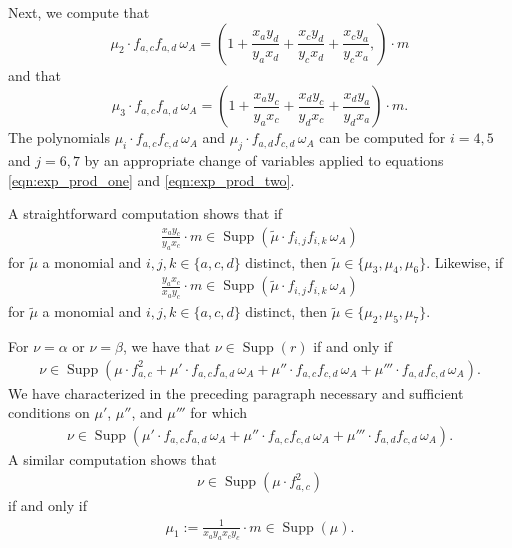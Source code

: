 \documentclass[12pt,a4paper]{amsart}
\theoremstyle{plain}
\theoremstyle{definition}
\theoremstyle{remark}
\DeclareMathOperator{\Supp}{Supp}
\begin{document}
Next, we compute that 
\begin{equation}
\label{eqn:exp_prod_one}
\mu_{2} \cdot f_{a,c}f_{a,d} \, \omega_{A} = \left( 
1 + \frac{x_{a}y_{d}}{y_{a}x_{d}} + \frac{x_{c}y_{d}}{y_{c}x_{d}} + \frac{x_{c}y_{a}}{y_{c}x_{a}},
\right) \cdot m
\end{equation}
and that
\begin{equation}
\label{eqn:exp_prod_two}
\mu_{3} \cdot f_{a,c}f_{a,d} \, \omega_{A} = \left(
1 + \frac{x_{a}y_{c}}{y_{a}x_{c}} + \frac{x_{d}y_{c}}{y_{d}x_{c}} + \frac{x_{d}y_{a}}{y_{d}x_{a}}
\right) \cdot m.
\end{equation}
The polynomials $\mu_{i} \cdot f_{a,c}f_{c,d} \, \omega_{A}$ and $\mu_{j} \cdot f_{a,d}f_{c,d} \, \omega_{A}$ can be computed for $i = 4,5$ and $j = 6,7$ by an appropriate change of variables applied to equations \eqref{eqn:exp_prod_one} and \eqref{eqn:exp_prod_two}.  

A straightforward computation shows that if 
\begin{align*}
    \frac{x_{a}y_{c}}{y_{a}x_{c}} \cdot m \in \Supp(\tilde{\mu}\cdot f_{i,j}f_{i,k} \, \omega_{A})
\end{align*}
for $\tilde{\mu}$ a monomial and $i,j,k \in \{a,c,d\}$ distinct, then $\tilde{\mu} \in \{\mu_{3},\mu_{4},\mu_{6}\}$. Likewise, if 
\begin{align*}
    \frac{y_{a}x_{c}}{x_{a}y_{c}} \cdot m \in \Supp(\tilde{\mu} \cdot f_{i,j}f_{i,k} \, \omega_{A})
\end{align*}
for $\tilde{\mu}$ a monomial and $i,j,k \in \{a,c,d\}$ distinct, then $\tilde{\mu} \in \{\mu_{2},\mu_{5},\mu_{7}\}$. 

For $\nu = \alpha$ or $\nu = \beta$, we have that $\nu \in \Supp(r)$ if and only if
\begin{align*}
    \nu \in \Supp(\mu \cdot f_{a,c}^{2} + \mu' \cdot f_{a,c} f_{a,d} \, \omega_{A} + \mu'' \cdot f_{a,c}  f_{c,d} \, \omega_{A} + \mu''' \cdot f_{a,d}  f_{c,d} \, \omega_{A}).
\end{align*}
We have characterized in the preceding paragraph necessary and sufficient conditions on $\mu'$, $\mu''$, and $\mu'''$ for which 
\begin{align*}
    \nu \in \Supp(\mu' \cdot f_{a,c} f_{a,d} \, \omega_{A} + \mu'' \cdot f_{a,c}  f_{c,d} \, \omega_{A} + \mu''' \cdot f_{a,d}  f_{c,d} \, \omega_{A}).
\end{align*}
A similar computation shows that
\begin{align*}
    \nu \in \Supp(\mu\cdot f_{a,c}^{2})
\end{align*}
if and only if
\begin{align*}
    \mu_{1} := \frac{1}{x_{a}y_{a}x_{c}y_{c}}\cdot m \in \Supp(\mu).
\end{align*}
\end{document}

